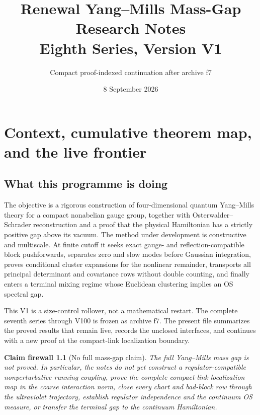 \documentclass[11pt,oneside]{book}
\title{Renewal Yang--Mills Mass-Gap Research Notes\\
Eighth Series, Version V1}
\author{Compact proof-indexed continuation after archive f7}
\date{8 September 2026}
\newtheorem{firewall}[theorem]{Claim firewall}
\theoremstyle{definition}
\theoremstyle{remark}
\begin{document}
\maketitle
\tableofcontents

\chapter{Context, cumulative theorem map, and the live frontier}
\label{ch:e8v1-context}

\section{What this programme is doing}
\label{sec:e8v1-purpose}

The objective is a rigorous construction of four-dimensional quantum
Yang--Mills theory for a compact nonabelian gauge group, together with
Osterwalder--Schrader reconstruction and a proof that the physical
Hamiltonian has a strictly positive gap above its vacuum.  The method
under development is constructive and multiscale.  At finite cutoff it
seeks exact gauge- and reflection-compatible block pushforwards,
separates zero and slow modes before Gaussian integration, proves
conditional cluster expansions for the nonlinear remainder, transports
all principal determinant and covariance rows without double counting,
and finally enters a terminal mixing regime whose Euclidean clustering
implies an OS spectral gap.

This V1 is a size-control rollover, not a mathematical restart.  The
complete seventh series through V100 is frozen as archive f7.  The
present file summarizes the proved results that remain live, records the
unclosed interfaces, and continues with a new proof at the compact-link
localization boundary.

\begin{firewall}[No full mass-gap claim]
\label{fire:e8v1-no-gap}
The full Yang--Mills mass gap is not proved.  In particular, the notes
do not yet construct a regulator-compatible nonperturbative running
coupling, prove the complete compact-link localization map in the
coarse interaction norm, close every chart and bad-block row through
the ultraviolet trajectory, establish regulator independence and the
continuum OS measure, or transfer the terminal gap to the continuum
Hamiltonian.
\end{firewall}
\end{document}
